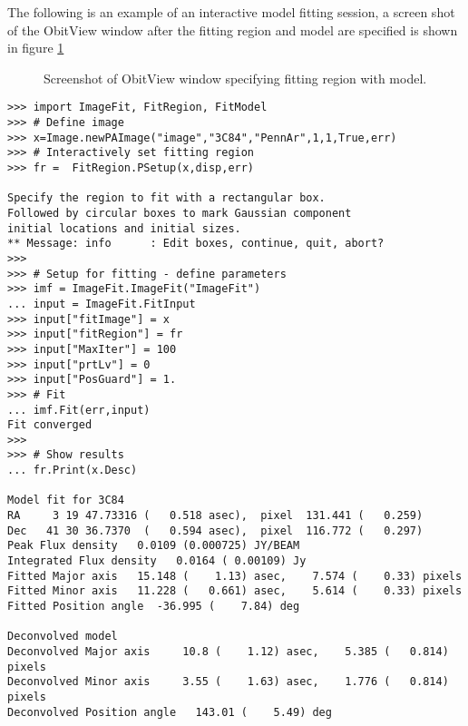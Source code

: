 \documentclass[11pt]{report}
\begin{document}
The following is an example of an interactive model fitting session, a
screen shot of the ObitView window after the fitting region and model
are specified is shown in figure \ref{ImageFitFig}
\begin{figure}
\centerline{}
\caption{ 
Screenshot of ObitView window specifying fitting region with model.
}
\label{ImageFitFig}
\end{figure}
\begin{verbatim}
>>> import ImageFit, FitRegion, FitModel
>>> # Define image
>>> x=Image.newPAImage("image","3C84","PennAr",1,1,True,err)
>>> # Interactively set fitting region
>>> fr =  FitRegion.PSetup(x,disp,err)

Specify the region to fit with a rectangular box.
Followed by circular boxes to mark Gaussian component
initial locations and initial sizes.
** Message: info      : Edit boxes, continue, quit, abort?
>>> 
>>> # Setup for fitting - define parameters
>>> imf = ImageFit.ImageFit("ImageFit")
... input = ImageFit.FitInput
>>> input["fitImage"] = x
>>> input["fitRegion"] = fr
>>> input["MaxIter"] = 100
>>> input["prtLv"] = 0
>>> input["PosGuard"] = 1.
>>> # Fit
... imf.Fit(err,input)
Fit converged
>>> 
>>> # Show results
... fr.Print(x.Desc)

Model fit for 3C84    
RA     3 19 47.73316 (   0.518 asec),  pixel  131.441 (   0.259)
Dec   41 30 36.7370  (   0.594 asec),  pixel  116.772 (   0.297)
Peak Flux density   0.0109 (0.000725) JY/BEAM 
Integrated Flux density   0.0164 ( 0.00109) Jy
Fitted Major axis   15.148 (    1.13) asec,    7.574 (    0.33) pixels
Fitted Minor axis   11.228 (   0.661) asec,    5.614 (    0.33) pixels
Fitted Position angle  -36.995 (    7.84) deg

Deconvolved model
Deconvolved Major axis     10.8 (    1.12) asec,    5.385 (   0.814) pixels
Deconvolved Minor axis     3.55 (    1.63) asec,    1.776 (   0.814) pixels
Deconvolved Position angle   143.01 (    5.49) deg
\end{verbatim}
\end{document}
